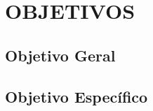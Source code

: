 
\chapter{OBJETIVOS}
\label{chap:objetivos}

\section{Objetivo Geral}

\lipsum[5-6]

\section{Objetivo Específico}

\lipsum[5-6]